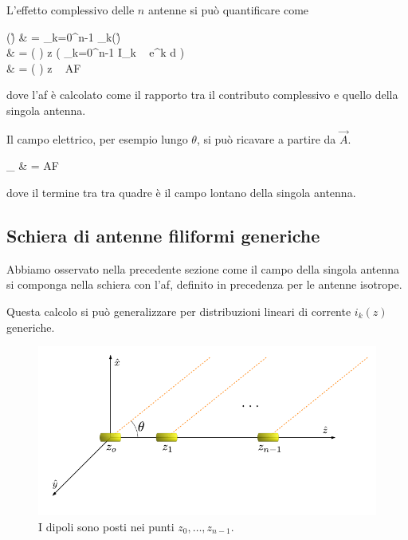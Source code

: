 		L'effetto complessivo delle $n$ antenne si può quantificare come
		\begin{esp}
			(\r)
			& = \sum_{k=0}^{n-1} _k(\r) \\
			& = \frac{\mu}{4\pi}
				\left(  \right)
				\Delta z
				\left( \sum_{k=0}^{n-1} I_k ~ e^{\jmath k \beta d \cos \theta} \right)  \\
			& = \frac{\mu}{4\pi}
				\left(  \right)
				\Delta z ~ AF \, 
		\end{esp}
		dove l'\gls{af} è calcolato come il rapporto tra il contributo complessivo e quello della singola antenna.

		Il campo elettrico, per esempio lungo $\theta$, si può ricavare a partire da $\vec{A}$.
		\begin{esp}
			\vec{E}_\theta
			& = \left[
					\jmath \frac{\eta_0}{2\lambda}
					\left( \frac{e^{-\jmath \beta r}}{r} \right)
					\Delta z \, \sin \theta \, \hat{z}
				\right] AF
		\end{esp}
		dove il termine tra tra quadre è il campo lontano della singola antenna.

	\subsection{Schiera di antenne filiformi generiche}
		Abbiamo osservato nella precedente sezione come il campo della singola antenna si componga nella schiera con l'\gls{af}, definito in precedenza per le antenne isotrope.

		Questa calcolo si può generalizzare per distribuzioni lineari di corrente $i_k(z)$ generiche.

		\begin{figure}[ht]
			\centering
			\includegraphics{img/schiera_non_isotropa_dipoli.pdf}
			\caption{I dipoli sono posti nei punti $z_0, \ldots, z_{n-1}$.}
			\label{fig:schiera_non_isotropa_dipoli}
		\end{figure}

